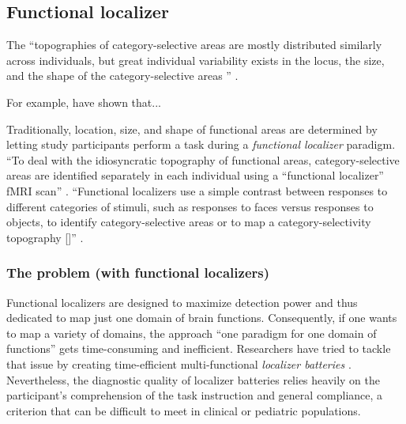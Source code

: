 
\subsection{Functional localizer}


The ``topographies of category-selective areas are mostly distributed similarly
across individuals, but great individual variability exists in the locus, the
size, and the shape of the category-selective areas \citep{zhen2015quantifying,
zhen2017quantifying} '' \citep{jiahui2020predicting}.


For example, \citep{frost2012measuring, weiner2018defining,
rosenke2021probabilistic, wang2015probabilistic} have shown that...


Traditionally, location, size, and shape of functional areas are determined by
letting study participants perform a task during a \textit{functional localizer}
paradigm.
%
``To deal with the idiosyncratic topography of functional areas,
category-selective areas are identified separately in each individual using a
``functional localizer'' fMRI scan'' \citep{jiahui2020predicting}.
%
``Functional localizers use a simple contrast between responses to different
categories of stimuli, such as responses to faces versus responses to objects,
to identify category-selective areas or to map a category-selectivity topography
[\citep{saxe2006divide}]'' \citep{jiahui2020predicting}.


\subsubsection{The problem (with functional localizers)}

Functional localizers are designed to maximize detection power and thus
dedicated to map just one domain of brain functions.
Consequently, if one wants to map a variety of domains, the approach ``one
paradigm for one domain of functions'' gets time-consuming and inefficient.
Researchers have tried to tackle that issue by creating time-efficient
multi-functional \textit{localizer batteries} \citep[e.g.,][]{barch2013function,
drobyshevsky2006rapid, pinel2007fast}.
Nevertheless, the diagnostic quality of localizer batteries relies heavily on
the participant's comprehension of the task instruction and general compliance,
a criterion that can be difficult to meet in clinical or pediatric populations.


